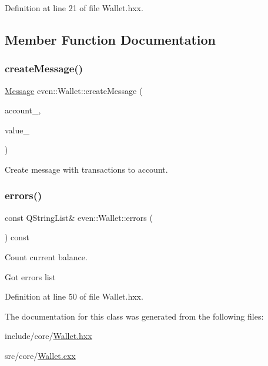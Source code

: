 Definition at line 21 of file Wallet.\+hxx.



\subsection{Member Function Documentation}
\mbox{\label{classeven_1_1_wallet_abd74f2e09f5e7f30c6b290b6ad33407d}} 
\subsubsection{\texorpdfstring{create\+Message()}{createMessage()}}
{\footnotesize\ttfamily \mbox{\hyperlink{classeven_1_1_message}{Message}} even\+::\+Wallet\+::create\+Message (\begin{DoxyParamCaption}\item[{Q\+String}]{account\+\_\+,  }\item[{int}]{value\+\_\+ }\end{DoxyParamCaption})}

Create message with transactions to account. \mbox{\label{classeven_1_1_wallet_ad94dc38a6d0929c544b4037d5752e4f5}} 
\subsubsection{\texorpdfstring{errors()}{errors()}}
{\footnotesize\ttfamily const Q\+String\+List\& even\+::\+Wallet\+::errors (\begin{DoxyParamCaption}{ }\end{DoxyParamCaption}) const\hspace{0.3cm}{\ttfamily [inline]}}



Count current balance. 

Got errors list 

Definition at line 50 of file Wallet.\+hxx.



The documentation for this class was generated from the following files\+:\begin{DoxyCompactItemize}
\item 
include/core/\mbox{\hyperlink{_wallet_8hxx}{Wallet.\+hxx}}\item 
src/core/\mbox{\hyperlink{_wallet_8cxx}{Wallet.\+cxx}}\end{DoxyCompactItemize}
